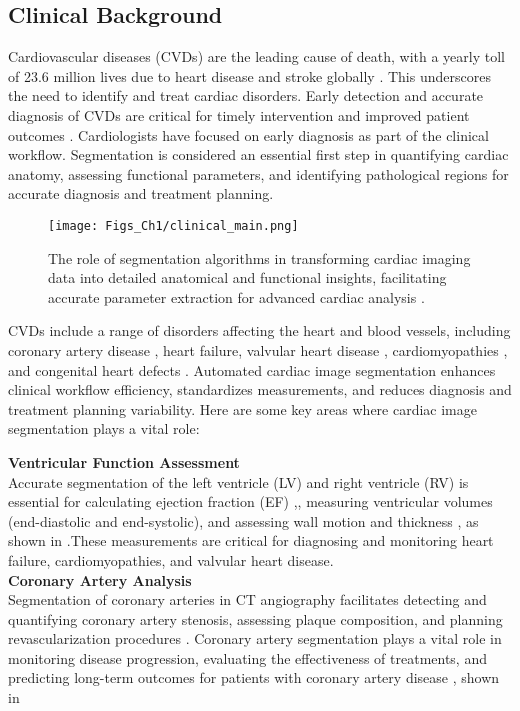 \subsection{Clinical Background}
Cardiovascular diseases (CVDs) are the leading cause of death, with a yearly toll of 23.6 million lives due to heart disease and stroke globally \cite{greenfield2019cardiovascular}. This underscores the need to identify and treat cardiac disorders. 
Early detection and accurate diagnosis of CVDs are critical for timely intervention and improved patient outcomes \cite{WHO_stats}.  Cardiologists have focused on early diagnosis as part of the clinical workflow. Segmentation is considered an essential first step in quantifying cardiac anatomy, assessing functional parameters, and identifying pathological regions for accurate diagnosis and treatment planning. \cite{villegas2024beating}

\begin{figure}[b!]
\centering
\texttt{[image: Figs\_Ch1/clinical\_main.png]}
\caption{The role of segmentation algorithms in transforming cardiac imaging data into detailed anatomical and functional insights, facilitating accurate parameter extraction for advanced cardiac analysis \cite{villegas2024beating}.}
\label{fig1_5}
\end{figure}

CVDs include a range of disorders affecting the heart and blood vessels, including coronary artery disease \cite{malakar2019review}, heart failure, valvular heart disease \cite{hupp2015cardiovascular}, cardiomyopathies \cite{celermajer2012cardiovascular}, and congenital heart defects \cite{jenkins2007noninherited}. Automated cardiac image segmentation enhances clinical workflow efficiency, standardizes measurements, and reduces diagnosis and treatment planning variability. Here are some key areas where cardiac image segmentation plays a vital role:

\noindent\textbf{Ventricular Function Assessment}\\
Accurate segmentation of the left ventricle (LV) and right ventricle (RV) is essential for calculating ejection fraction (EF) \cite{liu2021deep},\cite{tokodi2023deep}, measuring ventricular volumes (end-diastolic and end-systolic), and assessing wall motion and thickness \cite{li2022deep}, as shown in .These measurements are critical for diagnosing and monitoring heart failure, cardiomyopathies, and valvular heart disease.  \cite{rana2019tricuspid}\\
\noindent \textbf{Coronary Artery Analysis}\\
Segmentation of coronary arteries in CT angiography facilitates detecting and quantifying coronary artery stenosis, assessing plaque composition, and planning revascularization procedures \cite{kaba2023application}. Coronary artery segmentation plays a vital role in monitoring disease progression, evaluating the effectiveness of treatments, and predicting long-term outcomes for patients with coronary artery disease \cite{mahendiran2025angiopy}, shown in \\

